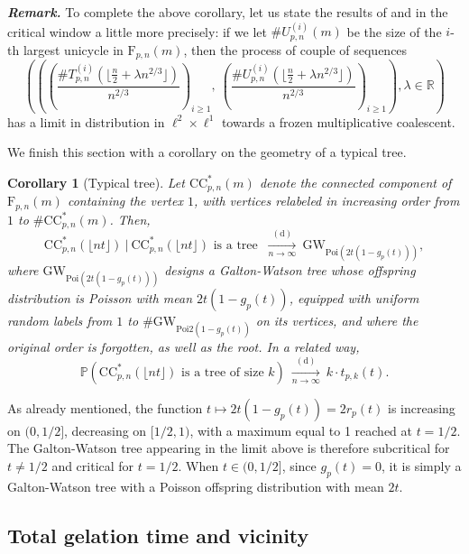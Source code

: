 \documentclass[a4, 11pt]{article}
\numberwithin{equation}{section}
\theoremstyle{plain}
\newtheorem{corollary}[theorem]{Corollary}
\theoremstyle{definition}
\theoremstyle{remark}
\begin{document}
\bigskip

\emph{\textbf{Remark.}} To complete the above corollary, let us state the results of \cite{ContatCurien23} and \cite{viau25} in the critical window a little more precisely: if we let $\#U^{(i)}_{p,n}(m)$ be the size of the $i$-th largest unicycle in $\mathrm{F}_{p,n}(m)$, then the process of couple of sequences $$\left(\left(\left(\frac{\#T^{(i)}_{p,n}(\lfloor \frac{n}{2} + \lambda n^{2/3}\rfloor)}{n^{2/3}}\right)_{i\geq 1},~\left(\frac{\#U^{(i)}_{p,n}(\lfloor \frac{n}{2} + \lambda n^{2/3}\rfloor)}{n^{2/3}}\right)_{i\geq 1}\right), \lambda \in \mathbb R \right)$$
has a limit in distribution in $\ell^2 \times \ell^1$ towards a frozen multiplicative coalescent.

\bigskip

We finish this section with a corollary on the geometry of a typical tree.

\begin{corollary}[Typical tree]
\label{cor:CC1}
Let $\mathrm{CC}^*_{p,n}(m)$ denote the connected component of $\mathrm F_{p,n}(m)$ containing the vertex $1$, with vertices relabeled in increasing order from $1$ to $\# \mathrm{CC}^*_{p,n}(m)$. Then,
$$
\mathrm{CC}^*_{p,n}(\lfloor nt \rfloor)~ | ~  \mathrm{CC}^*_{p,n}(\lfloor nt \rfloor)\text{ is a tree }~ \underset{n \rightarrow \infty}{\overset{\mathrm{(d)}} \longrightarrow}~\mathrm{GW}_{\mathrm {Poi}(2t(1-g_p(t)))},
$$
where $\mathrm{GW}_{\mathrm {Poi}(2t(1-g_p(t)))}$ designs a Galton-Watson tree whose offspring distribution is Poisson with mean $2t(1-g_p(t))$, equipped with uniform random labels from $1$ to $\#\mathrm{GW}_{\mathrm {Poi}{2(1-g_p(t))}}$ on its vertices, and where the original order is forgotten, as well as the root. 
In a related way,
$$\mathbb P \left( \mathrm{CC}^*_{p,n}(\lfloor nt \rfloor)\text{ is a tree of size $k$} \right)~ \underset{n \rightarrow \infty}{\overset{\mathrm{(d)}} \longrightarrow} ~ k\cdot t_{p,k}(t).$$
\end{corollary}

\bigskip

As already mentioned, the function $t \mapsto 2t(1-g_p(t))=2r_p(t)$ is increasing on $(0,1/2]$, decreasing on $[1/2,1)$, with a maximum equal to 1 reached at $t=1/2$. The Galton-Watson tree appearing in the limit above is therefore subcritical for $t \neq 1/2$ and critical for $t=1/2$. When $t \in (0,1/2]$, since $g_p(t)=0$, it is simply a Galton-Watson tree with a Poisson offspring distribution with mean $2t$.

\subsection{Total gelation time and vicinity}
\end{document}
